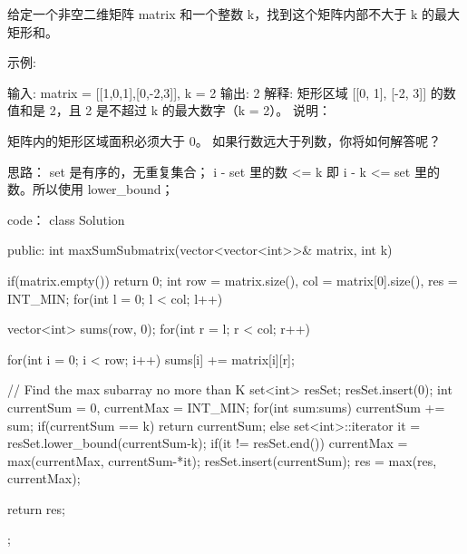 给定一个非空二维矩阵 matrix 和一个整数 k，找到这个矩阵内部不大于 k 的最大矩形和。

示例:

输入: matrix = [[1,0,1],[0,-2,3]], k = 2
输出: 2 
解释: 矩形区域 [[0, 1], [-2, 3]] 的数值和是 2，且 2 是不超过 k 的最大数字（k = 2）。
说明：

矩阵内的矩形区域面积必须大于 0。
如果行数远大于列数，你将如何解答呢？






























思路：
set 是有序的，无重复集合；
   i - set 里的数 <= k
即 i - k <= set 里的数。所以使用 lower_bound；






























code：
class Solution {
public:
    int maxSumSubmatrix(vector<vector<int>>& matrix, int k) {
    if(matrix.empty()) return 0;
    int row = matrix.size(), col = matrix[0].size(), res = INT_MIN;
    for(int l = 0; l < col; l++)
    {
        vector<int> sums(row, 0);
        for(int r = l; r < col; r++)
        {
            for(int i = 0; i < row; i++) sums[i] += matrix[i][r];

            // Find the max subarray no more than K
            set<int> resSet;
            resSet.insert(0);
            int currentSum = 0, currentMax = INT_MIN;
            for(int sum:sums)
            {
                currentSum += sum;
                if(currentSum == k) return currentSum;
                else
                {
                    set<int>::iterator it = resSet.lower_bound(currentSum-k);
                    if(it != resSet.end()) currentMax = max(currentMax, currentSum-*it);
                    resSet.insert(currentSum);
                }
            }
            res = max(res, currentMax);
        }
    }
    return res;
}
};